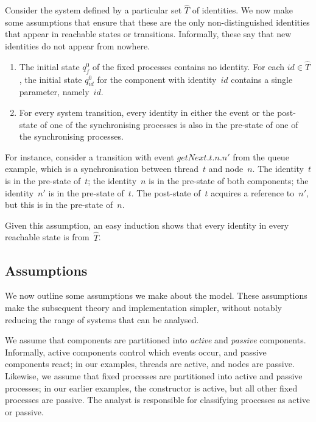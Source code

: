 
Consider the system defined by a particular set $\hat T$ of identities.  We now
make some assumptions that ensure that these are the only non-distinguished
identities that appear in reachable states or transitions.  Informally, these
say that new identities do not appear from nowhere.
%
\begin{enumerate}
\item The initial state $q_f^0$ of the fixed processes contains no identity.
  For each $id \in \hat{T}$,  the initial state $q_{id}^0$ for the component
  with identity~$id$ contains a single parameter, namely~$id$.

\item For every system transition, every identity in either the event or the
  post-state of one of the synchronising processes is also in the pre-state of
  one of the synchronising processes.
\end{enumerate}
%
For instance, consider a transition with event $getNext.t.n.n'$ from the queue
example, which is a synchronisation between thread~$t$ and node~$n$.  The
identity~$t$ is in the pre-state of~$t$; the identity~$n$ is in the pre-state
of both components; the identity~$n'$ is in the pre-state of~$t$.  The
post-state of~$t$ acquires a reference to~$n'$, but this is in the pre-state
of~$n$.

Given this assumption, an easy induction shows that every identity in every
reachable state is from~$\hat{T}$. 


\subsection{Assumptions}

We now outline some assumptions we make about the model.  These assumptions
make the subsequent theory and implementation simpler, without notably
reducing the range of systems that can be analysed.  

We assume that components are partitioned into \emph{active} and
\emph{passive} components.  Informally, active components control which events
occur, and passive components react; in our examples, threads are active, and
nodes are passive.  Likewise, we assume that fixed processes are partitioned
into active and passive processes; in our earlier examples, the constructor is
active, but all other fixed processes are passive.  The analyst is responsible
for classifying processes as active or passive. 


